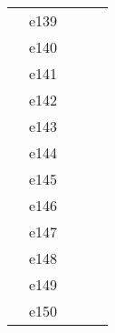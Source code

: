 \documentclass[10pt,letterpaper]{article}
\begin{document}
\begin{center}
\begin{tabular}{ |c|c|c|c|c|}
        & e139  &                &                &      \\
        & e140  &                &                &      \\
        & e141  &                &                &      \\
        & e142  &                &                &      \\
        & e143  &                &                &      \\
        & e144  &                &                &      \\
        & e145  &                &                &      \\
        & e146  &                &                &      \\
        & e147  &                &                &      \\
        & e148  &                &                &      \\
        & e149  &                &                &      \\
        & e150  &                &                &      \\

        \hline
        \end{tabular}
        \end{center}


\clearpage
\end{document}
